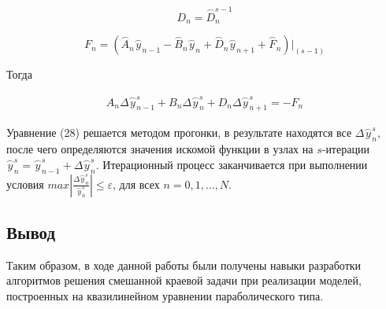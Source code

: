 \documentclass[a4paper,14pt]{article}
\begin{document}
\begin{equation}
	D_n = \stackrel{\frown}{D}_n^{s-1}
\end{equation}

\begin{equation}
	F_n = \left( \stackrel{\frown}{A}_n \stackrel{\frown}{y}_{n-1} - \stackrel{\frown}{B}_n \stackrel{\frown}{y}_n + \stackrel{\frown}{D}_n \stackrel{\frown}{y}_{n+1} + \stackrel{\frown}{F}_n \right) \bigg|_{(s-1)}
\end{equation}
	
Тогда

\begin{eqnarray}
	A_n \Delta \stackrel{\frown}{y}_{n-1}^s + B_n \Delta \stackrel{\frown}{y}_n^s + D_n \Delta \stackrel{\frown}{y}_{n+1}^s = - F_n
\end{eqnarray}

Уравнение (28) решается методом прогонки, в результате находятся все
$\Delta\stackrel{\frown}{y}_n^s$, после чего определяются значения искомой функции в узлах на
$s$-итерации $\stackrel{\frown}{y}_n^s = \stackrel{\frown}{y}_{n-1}^s + \Delta \stackrel{\frown}{y}_n^s$.
Итерационный процесс заканчивается при выполнении условия $max \left| \frac{\Delta \stackrel{\frown}{y}_n^s}{ \stackrel{\frown}{y}_n^s } \right| \leq \varepsilon$,
для всех $n = 0, 1, ..., N$.

\subsection*{Вывод}

Таким образом, в ходе данной работы были получены навыки 
разработки  алгоритмов решения смешанной краевой
 задачи при реализации моделей, построенных на 
 квазилинейном уравнении параболического типа. 
\end{document}
